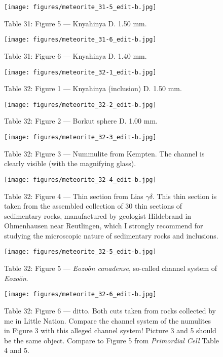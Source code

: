 \documentclass[a4paper, 12pt, oneside]{article}
\begin{document}
\clearpage
\begin{figure}[t]
\texttt{[image: figures/meteorite\_31-5\_edit-b.jpg]}
\caption{Table 31: Figure 5 --- Knyahinya D. 1.50 mm.}
\centering
\end{figure}
\clearpage
\begin{figure}[t]
\texttt{[image: figures/meteorite\_31-6\_edit-b.jpg]}
\caption{Table 31: Figure 6 --- Knyahinya D. 1.40 mm.}
\centering
\end{figure}
\clearpage
{}
\begin{figure}[t]
\texttt{[image: figures/meteorite\_32-1\_edit-b.jpg]}
\caption{Table 32: Figure 1 --- Knyahinya (inclusion) D. 1.50 mm.}
\centering
\end{figure}
\clearpage
\begin{figure}[t]
\texttt{[image: figures/meteorite\_32-2\_edit-b.jpg]}
\caption{Table 32: Figure 2 --- Borkut sphere D. 1.00 mm.}
\centering
\end{figure}
\clearpage
\begin{figure}[t]
\texttt{[image: figures/meteorite\_32-3\_edit-b.jpg]}
\caption{Table 32: Figure 3 --- Nummulite from Kempten. The channel is clearly visible (with the magnifying glass).}
\centering
\end{figure}
\clearpage
\begin{figure}[t]
\texttt{[image: figures/meteorite\_32-4\_edit-b.jpg]}
\caption{Table 32: Figure 4 --- Thin section from Lias $\gamma\delta$. This thin section is taken from the assembled collection of 30 thin sections of sedimentary rocks, manufactured by geologist Hildebrand in Ohmenhausen near Reutlingen, which I strongly recommend for studying the microscopic nature of sedimentary rocks and inclusions.}
\centering
\end{figure}
\clearpage
\begin{figure}[t]
\texttt{[image: figures/meteorite\_32-5\_edit-b.jpg]}
\caption{Table 32: Figure 5 --- \emph{Eozoön canadense}, so-called channel system of \emph{Eozoön}.}
\centering
\end{figure}
\clearpage
\begin{figure}[t]
\texttt{[image: figures/meteorite\_32-6\_edit-b.jpg]}
\caption{Table 32: Figure 6 --- ditto. Both cuts taken from rocks collected by me in Little Nation. Compare the channel system of the numulites in Figure 3 with this alleged channel system! Picture 3 and 5 should be the same object. Compare to Figure 5 from \emph{Primordial Cell} Table 4 and 5.}
\centering
\end{figure}
\clearpage
\pagestyle{plain}
\end{document}
